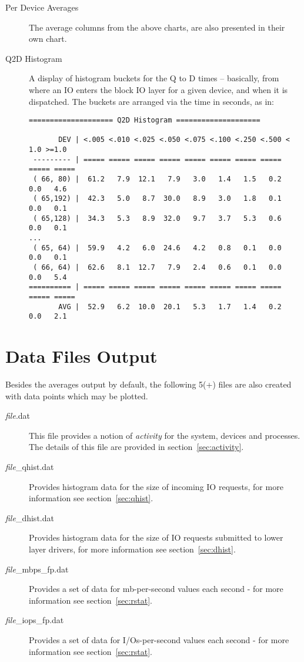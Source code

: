 \documentclass{article}
\begin{document}
\begin{description}
  \item[Per Device Averages] The average columns from the above charts,
  are also presented in their own chart.

  \item[Q2D Histogram] A display of histogram buckets for the Q to D times
  -- basically, from where an IO enters the block IO layer for a given
  device, and when it is dispatched. The buckets are arranged via the
  time in seconds, as in:

\begin{verbatim}
==================== Q2D Histogram ====================

       DEV | <.005 <.010 <.025 <.050 <.075 <.100 <.250 <.500 < 1.0 >=1.0
 --------- | ===== ===== ===== ===== ===== ===== ===== ===== ===== =====
 ( 66, 80) |  61.2   7.9  12.1   7.9   3.0   1.4   1.5   0.2   0.0   4.6
 ( 65,192) |  42.3   5.0   8.7  30.0   8.9   3.0   1.8   0.1   0.0   0.1
 ( 65,128) |  34.3   5.3   8.9  32.0   9.7   3.7   5.3   0.6   0.0   0.1
...
 ( 65, 64) |  59.9   4.2   6.0  24.6   4.2   0.8   0.1   0.0   0.0   0.1
 ( 66, 64) |  62.6   8.1  12.7   7.9   2.4   0.6   0.1   0.0   0.0   5.4
========== | ===== ===== ===== ===== ===== ===== ===== ===== ===== =====
       AVG |  52.9   6.2  10.0  20.1   5.3   1.7   1.4   0.2   0.0   2.1
\end{verbatim}

\end{description}

\newpage\section{\label{sec:data-files}Data Files Output}

  Besides the averages output by default, the following 5(+) files are also
  created with data points which may be plotted.

\begin{description}
  \item[\emph{file}.dat] This file provides a notion of \emph{activity}
  for the system, devices and processes. The details of this file are
  provided in section~\ref{sec:activity}.

  \item[\emph{file}\_qhist.dat] Provides histogram data for the size of
  incoming IO requests, for more information see section~\ref{sec:qhist}.

  \item[\emph{file}\_dhist.dat] Provides histogram data for the size
  of IO requests submitted to lower layer drivers, for more information
  see section~\ref{sec:dhist}.

  \item[\emph{file}\_mbps\_fp.dat] Provides a set of data for
  mb-per-second values each second
  - for more information see section~\ref{sec:rstat}.

  \item[\emph{file}\_iops\_fp.dat] Provides a set of data for
  I/Os-per-second values each second
  - for more information see section~\ref{sec:rstat}.

\end{description}
\end{document}
